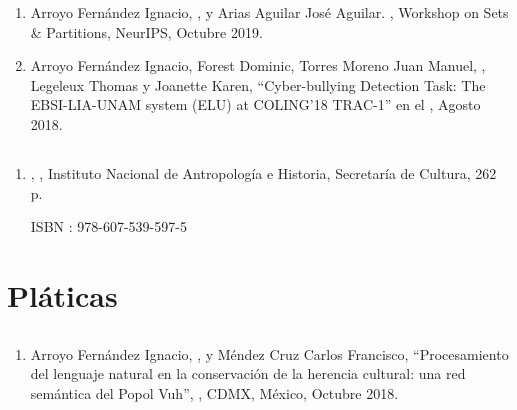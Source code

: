 \documentclass{curriculum-vitae}
\begin{document}
    \begin{enumerate}
      \item
        Arroyo Fernández Ignacio, , y Arias Aguilar
        José Aguilar. , Workshop on
        Sets \& Partitions, NeurIPS, Octubre 2019.

      \item
        Arroyo Fernández Ignacio, Forest Dominic, Torres Moreno Juan Manuel,
        , Legeleux Thomas y Joanette Karen,
        ``Cyber-bullying Detection Task: The EBSI-LIA-UNAM system (ELU) at
        COLING'18 TRAC-1'' en el , Agosto 2018.
    \end{enumerate}

    \subsection{}

    \begin{enumerate}
      \item
        ,
        ,
        Instituto Nacional de Antropología e Historia, Secretaría de Cultura,
        262 p.

        ISBN : 978-607-539-597-5
    \end{enumerate}

  \section{Pláticas}

    \subsection{}

    \begin{enumerate}
      \item
        Arroyo Fernández Ignacio, , y Méndez Cruz
        Carlos Francisco,
        ``Procesamiento del lenguaje natural en la conservación de la herencia
        cultural: una red semántica del Popol Vuh'',
        , CDMX, México, Octubre 2018.
    \end{enumerate}
\end{document}
